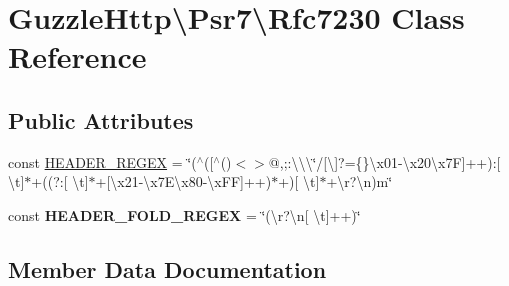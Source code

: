 \hypertarget{classGuzzleHttp_1_1Psr7_1_1Rfc7230}{}\section{Guzzle\+Http\textbackslash{}Psr7\textbackslash{}Rfc7230 Class Reference}
\label{classGuzzleHttp_1_1Psr7_1_1Rfc7230}
\subsection*{Public Attributes}
\begin{DoxyCompactItemize}
\item 
const \hyperlink{classGuzzleHttp_1_1Psr7_1_1Rfc7230_afd91a5e0576ddf430bbf74d9ca994572}{H\+E\+A\+D\+E\+R\+\_\+\+R\+E\+G\+EX} = \char`\"{}($^\wedge$(\mbox{[}$^\wedge$()$<$$>$@,;\+:\textbackslash{}\textbackslash{}\textbackslash{}\char`\"{}/\mbox{[}\textbackslash{}\mbox{]}?=\{\}\textbackslash{}x01-\/\textbackslash{}x20\textbackslash{}x7F\mbox{]}++)\+:\mbox{[} \textbackslash{}t\mbox{]}$\ast$+((?\+:\mbox{[} \textbackslash{}t\mbox{]}$\ast$+\mbox{[}\textbackslash{}x21-\/\textbackslash{}x7\+E\textbackslash{}x80-\/\textbackslash{}x\+FF\mbox{]}++)$\ast$+)\mbox{[} \textbackslash{}t\mbox{]}$\ast$+\textbackslash{}r?\textbackslash{}n)m\char`\"{}
\item 
\mbox{\label{classGuzzleHttp_1_1Psr7_1_1Rfc7230_a4ae4b11e6afe4fe3cfb36ab5f13c47bc}} 
const {\bfseries H\+E\+A\+D\+E\+R\+\_\+\+F\+O\+L\+D\+\_\+\+R\+E\+G\+EX} = \char`\"{}(\textbackslash{}r?\textbackslash{}n\mbox{[} \textbackslash{}t\mbox{]}++)\char`\"{}
\end{DoxyCompactItemize}


\subsection{Member Data Documentation}
\mbox{\label{classGuzzleHttp_1_1Psr7_1_1Rfc7230_afd91a5e0576ddf430bbf74d9ca994572}} 
